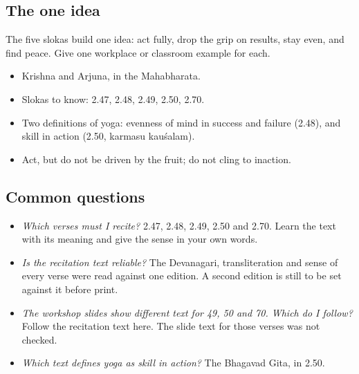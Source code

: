 \subsection*{The one idea}
The five slokas build one idea: act fully, drop the grip on results, stay even, and find peace. Give one workplace or classroom example for each.

\begin{recall}
\begin{itemize}
\item Krishna and Arjuna, in the Mahabharata.
\item Slokas to know: 2.47, 2.48, 2.49, 2.50, 2.70.
\item Two definitions of yoga: evenness of mind in success and failure (2.48), and skill in action (2.50, karmasu kauśalam).
\item Act, but do not be driven by the fruit; do not cling to inaction.
\end{itemize}
\end{recall}

\subsection*{Common questions}
\begin{itemize}
\item \emph{Which verses must I recite?} 2.47, 2.48, 2.49, 2.50 and 2.70. Learn the text with its meaning and give the sense in your own words.
\item \emph{Is the recitation text reliable?} The Devanagari, transliteration and sense of every verse were read against one edition. A second edition is still to be set against it before print.
\item \emph{The workshop slides show different text for 49, 50 and 70. Which do I follow?} Follow the recitation text here. The slide text for those verses was not checked.
\item \emph{Which text defines yoga as skill in action?} The Bhagavad Gita, in 2.50.
\end{itemize}

